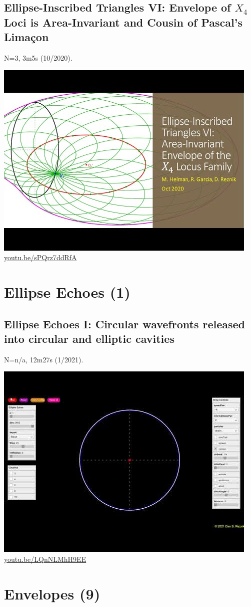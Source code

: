 \documentclass[12pt]{amsart}
\begin{document}
\subsection{Ellipse-Inscribed Triangles VI: Envelope of $X_{4}$ Loci is Area-Invariant and Cousin of Pascal's Limaçon}
\label{vid:sPQrz7ddRfA}
\noindent N=3, 3m5s (10/2020). 
\begin{center}\includegraphics[width=.5\textwidth]{pics/sPQrz7ddRfA.jpg} \\ 
\href{https://youtu.be/sPQrz7ddRfA}{\url{youtu.be/sPQrz7ddRfA}}\end{center}
% 


\section{Ellipse Echoes (1)}

\subsection{Ellipse Echoes I: Circular wavefronts released into circular and elliptic cavities}
\label{vid:LQnNLMhH9EE}
\noindent N=n/a, 12m27s (1/2021). 
\begin{center}\includegraphics[width=.5\textwidth]{pics/LQnNLMhH9EE.jpg} \\ 
\href{https://youtu.be/LQnNLMhH9EE}{\url{youtu.be/LQnNLMhH9EE}}\end{center}
% 


\section{Envelopes (9)}
\end{document}
